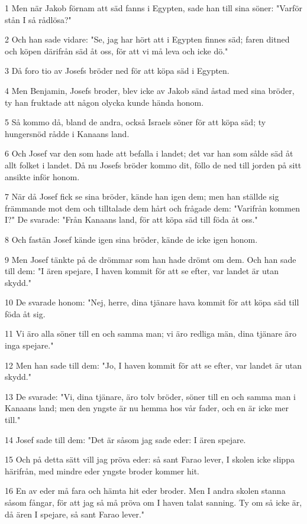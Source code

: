 \par 1 Men när Jakob förnam att säd fanns i Egypten, sade han till sina söner: "Varför stån I så rådlösa?"
\par 2 Och han sade vidare: "Se, jag har hört att i Egypten finnes säd; faren ditned och köpen därifrån säd åt oss, för att vi må leva och icke dö."
\par 3 Då foro tio av Josefs bröder ned för att köpa säd i Egypten.
\par 4 Men Benjamin, Josefs broder, blev icke av Jakob sänd åstad med sina bröder, ty han fruktade att någon olycka kunde hända honom.
\par 5 Så kommo då, bland de andra, också Israels söner för att köpa säd; ty hungersnöd rådde i Kanaans land.
\par 6 Och Josef var den som hade att befalla i landet; det var han som sålde säd åt allt folket i landet. Då nu Josefs bröder kommo dit, föllo de ned till jorden på sitt ansikte inför honom.
\par 7 När då Josef fick se sina bröder, kände han igen dem; men han ställde sig främmande mot dem och tilltalade dem hårt och frågade dem: "Varifrån kommen I?" De svarade: "Från Kanaans land, för att köpa säd till föda åt oss."
\par 8 Och fastän Josef kände igen sina bröder, kände de icke igen honom.
\par 9 Men Josef tänkte på de drömmar som han hade drömt om dem. Och han sade till dem: "I ären spejare, I haven kommit för att se efter, var landet är utan skydd."
\par 10 De svarade honom: "Nej, herre, dina tjänare hava kommit för att köpa säd till föda åt sig.
\par 11 Vi äro alla söner till en och samma man; vi äro redliga män, dina tjänare äro inga spejare."
\par 12 Men han sade till dem: "Jo, I haven kommit för att se efter, var landet är utan skydd."
\par 13 De svarade: "Vi, dina tjänare, äro tolv bröder, söner till en och samma man i Kanaans land; men den yngste är nu hemma hos vår fader, och en är icke mer till."
\par 14 Josef sade till dem: "Det är såsom jag sade eder: I ären spejare.
\par 15 Och på detta sätt vill jag pröva eder: så sant Farao lever, I skolen icke slippa härifrån, med mindre eder yngste broder kommer hit.
\par 16 En av eder må fara och hämta hit eder broder. Men I andra skolen stanna såsom fångar, för att jag så må pröva om I haven talat sanning. Ty om så icke är, då ären I spejare, så sant Farao lever."
